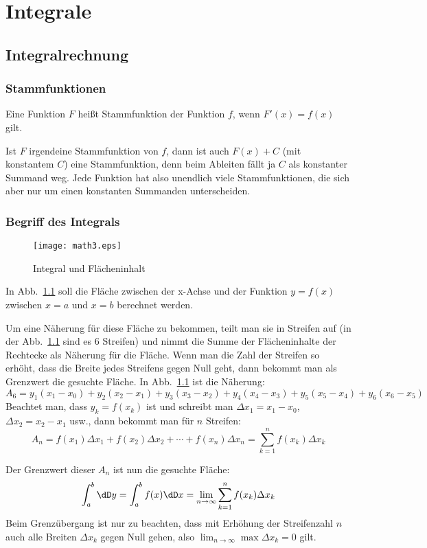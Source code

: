 \chapter{Integrale}
\section{Integralrechnung}
\subsection{Stammfunktionen}
Eine Funktion $F$ heißt Stammfunktion der Funktion $f$, wenn $F'(x)=f(x)$
gilt.

Ist $F$ irgendeine Stammfunktion von $f$, dann ist auch $F(x)+C$ (mit
konstantem $C$) eine Stammfunktion, denn beim Ableiten fällt ja $C$ als
konstanter Summand weg. Jede Funktion hat also unendlich viele
Stammfunktionen, die sich aber nur um einen konstanten Summanden
unterscheiden.

\subsection{Begriff des Integrals}

\begin{figure}[htbp]\centering
  \texttt{[image: math3.eps]}
  \caption{Integral und Flächeninhalt}
  \label{fig:6}
\end{figure}

In Abb.~\ref{fig:6} soll die Fläche zwischen der x-Achse und der Funktion
$y=f(x)$ zwischen $x=a$ und $x=b$ berechnet werden.

Um eine Näherung für diese Fläche zu bekommen, teilt man sie in Streifen auf
(in der Abb.~\ref{fig:6} sind es 6 Streifen) und nimmt die Summe der
Flächeninhalte der Rechtecke als Näherung für die Fläche. Wenn man die Zahl
der Streifen so erhöht, dass die Breite jedes Streifens gegen Null geht, dann
bekommt man als Grenzwert die gesuchte Fläche. In Abb.~\ref{fig:6} ist die
Näherung:
\[
A_6=y_1(x_1-x_0)+y_2(x_2-x_1)+y_3(x_3-x_2)
+y_4(x_4-x_3)+y_5(x_5-x_4)+y_6(x_6-x_5)
\]
Beachtet man, dass $y_k=f(x_k)$ ist und schreibt man $\Delta x_1=x_1-x_0$,
$\Delta x_2=x_2-x_1$ usw., dann bekommt man für $n$ Streifen:
\[
A_n=f(x_1)\Delta x_1+f(x_2)\Delta x_2+\cdots+f(x_n)\Delta x_n=
\sum_{k=1}^n f(x_k)\Delta x_k
\]

Der Grenzwert dieser $A_n$ ist nun die gesuchte Fläche:
\begin{equation}
  \label{eq:33}
  \int_a^b \dD y=
  \int_a^b f(x)\dD x=\lim_{n\to\infty}\sum_{k=1}^n f(x_k)\Delta x_k
\end{equation}
Beim Grenzübergang ist nur zu beachten, dass mit Erhöhung der Streifenzahl $n$
auch alle Breiten $\Delta x_k$ gegen Null gehen, also
$\lim_{n\to\infty}\max\Delta x_k=0$ gilt.

